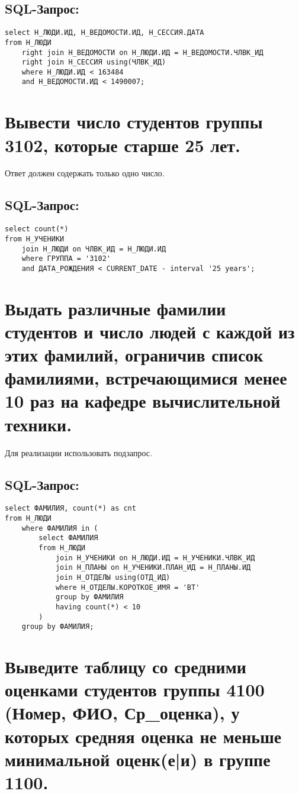 \subsection{SQL-Запрос:}
\begin{verbatim}
select Н_ЛЮДИ.ИД, Н_ВЕДОМОСТИ.ИД, Н_СЕССИЯ.ДАТА
from Н_ЛЮДИ
	right join Н_ВЕДОМОСТИ on Н_ЛЮДИ.ИД = Н_ВЕДОМОСТИ.ЧЛВК_ИД
	right join Н_СЕССИЯ using(ЧЛВК_ИД)
	where Н_ЛЮДИ.ИД < 163484
	and Н_ВЕДОМОСТИ.ИД < 1490007;
\end{verbatim}

\newpage
\section{Вывести число студентов группы 3102, которые старше 25 лет.}
Ответ должен содержать только одно число.

\subsection{SQL-Запрос:}
\begin{verbatim}
select count(*)
from Н_УЧЕНИКИ
	join Н_ЛЮДИ on ЧЛВК_ИД = Н_ЛЮДИ.ИД
	where ГРУППА = '3102'
	and ДАТА_РОЖДЕНИЯ < CURRENT_DATE - interval '25 years';
\end{verbatim}

\newpage
\section{Выдать различные фамилии студентов и число людей с каждой из этих фамилий, ограничив список фамилиями, встречающимися менее 10 раз на кафедре вычислительной техники.}
Для реализации использовать подзапрос.
\subsection{SQL-Запрос:}
\begin{verbatim}
select ФАМИЛИЯ, count(*) as cnt
from Н_ЛЮДИ
    where ФАМИЛИЯ in (
        select ФАМИЛИЯ
        from Н_ЛЮДИ
            join Н_УЧЕНИКИ on Н_ЛЮДИ.ИД = Н_УЧЕНИКИ.ЧЛВК_ИД
            join Н_ПЛАНЫ on Н_УЧЕНИКИ.ПЛАН_ИД = Н_ПЛАНЫ.ИД
            join Н_ОТДЕЛЫ using(ОТД_ИД)
            where Н_ОТДЕЛЫ.КОРОТКОЕ_ИМЯ = 'ВТ'
            group by ФАМИЛИЯ
            having count(*) < 10
        )
    group by ФАМИЛИЯ;
\end{verbatim}

\newpage
\section{Выведите таблицу со средними оценками студентов группы 4100 (Номер, ФИО, Ср\_оценка), у которых средняя оценка не меньше минимальной оценк(е|и) в группе 1100.}
